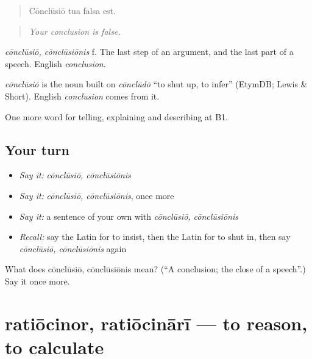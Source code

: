 \begin{quote}
Cōnclūsiō tua falsa est.
\end{quote}

\begin{quote}
\emph{Your conclusion is false.}
\end{quote}

\emph{cōnclūsiō, cōnclūsiōnis} f. The last step of an argument, and the last part of a speech. English \emph{conclusion}.

\begin{cousinweb}
\emph{cōnclūsiō} is the noun built on \emph{cōnclūdō} \textquotedblleft{}to shut up, to infer\textquotedblright{} (EtymDB; Lewis \& Short). English \emph{conclusion} comes from it.
\end{cousinweb}

\begin{grammarlens}[title={What you've built}]
One more word for telling, explaining and describing at B1.
\end{grammarlens}

\subsection*{Your turn}
\begin{itemize}
\raggedright
  \item \emph{Say it:} \emph{cōnclūsiō, cōnclūsiōnis}
  \item \emph{Say it:} \emph{cōnclūsiō, cōnclūsiōnis}, once more
  \item \emph{Say it:} a sentence of your own with \emph{cōnclūsiō, cōnclūsiōnis}
  \item \emph{Recall:} say the Latin for to insist, then the Latin for to shut in, then say \emph{cōnclūsiō, cōnclūsiōnis} again
\end{itemize}

\begin{tcolorbox}[breakable,colback=teal!4,colframe=teal!35!black,title={Before you move on}]
What does cōnclūsiō, cōnclūsiōnis mean? (\textquotedblleft{}A conclusion; the close of a speech\textquotedblright{}.) Say it once more.
\end{tcolorbox}
\section[ratiōcinor, ratiōcinārī]{ratiōcinor, ratiōcinārī — to reason, to calculate}

\label{lesson:LA-C364-ratiocinor}




